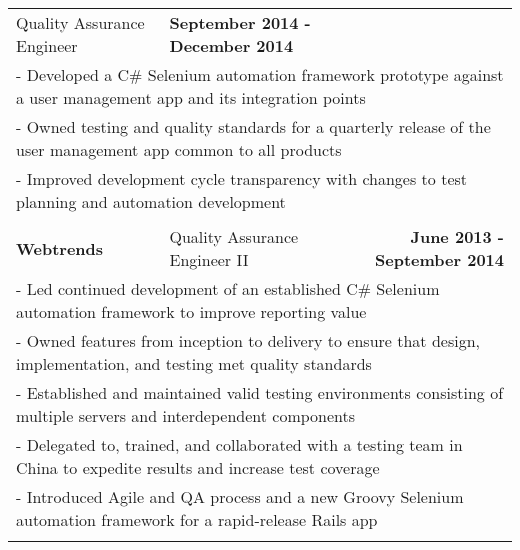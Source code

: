 \documentclass[letterpaper]{article}
\begin{document}
\begin{center}
\begin{tabular}{p{}p{}r}
				Quality Assurance Engineer										&
				\textbf{September 2014 - December 2014 \quad}
			\\
				\multicolumn{3}{p{\textwidth}}{\quad\quad - Developed a C\# Selenium automation framework prototype against a user management app and its integration points} 
			\\
				\multicolumn{3}{p{\textwidth}}{\quad\quad - Owned testing and quality standards for a quarterly release of the user management app common to all products} 
			\\
				\multicolumn{3}{p{\textwidth}}{\quad\quad - Improved development cycle transparency with changes to test planning and automation development} 
			\\
			\\ %
				\textbf{Webtrends}					&
				Quality Assurance Engineer II							&
				\textbf{June 2013 - September 2014 \quad}
			\\
				\multicolumn{3}{p{\textwidth}}{\quad\quad - Led continued development of an established C\# Selenium automation framework to improve reporting value}
			\\
				\multicolumn{3}{p{\textwidth}}{\quad\quad - Owned features from inception to delivery to ensure that design, implementation, and testing met quality standards} 
			\\
				\multicolumn{3}{p{\textwidth}}{\quad\quad - Established and maintained valid testing environments consisting of multiple servers and interdependent components} 
			\\
				\multicolumn{3}{p{\textwidth}}{\quad\quad - Delegated to, trained, and collaborated with a testing team in China to expedite results and increase test coverage}
			\\
				\multicolumn{3}{p{\textwidth}}{\quad\quad - Introduced Agile and QA process and a new Groovy Selenium automation framework for a rapid-release Rails app}  
			\\
			\\

\end{tabular}
\end{center}
\end{document}
